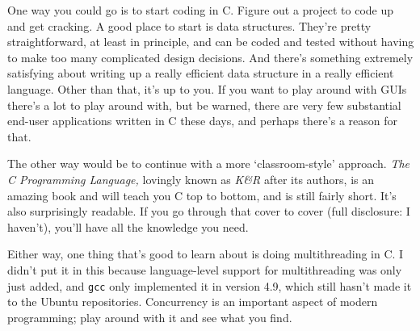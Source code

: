 \documentclass[ebook,11pt,oneside,openany]{memoir}
\newcommand{\cf}[1]{\texttt{#1}}
\begin{document}
One way you could go is to start coding in C. Figure out a project to code up and get cracking. A good place to start is data structures. They're pretty straightforward, at least in principle, and can be coded and tested without having to make too many complicated design decisions. And there's something extremely satisfying about writing up a really efficient data structure in a really efficient language. Other than that, it's up to you. If you want to play around with GUIs there's a lot to play around with, but be warned, there are very few substantial end-user applications written in C these days, and perhaps there's a reason for that.

The other way would be to continue with a more `classroom-style' approach. \textit{The C Programming Language,} lovingly known as \textit{K\&R} after its authors, is an amazing book and will teach you C top to bottom, and is still fairly short. It's also surprisingly readable. If you go through that cover to cover (full disclosure: I haven't), you'll have all the knowledge you need.

Either way, one thing that's good to learn about is doing multithreading in C. I didn't put it in this because language-level support for multithreading was only just added, and \cf{gcc} only implemented it in version 4.9, which still hasn't made it to the Ubuntu repositories. Concurrency is an important aspect of modern programming; play around with it and see what you find. 
\end{document}
